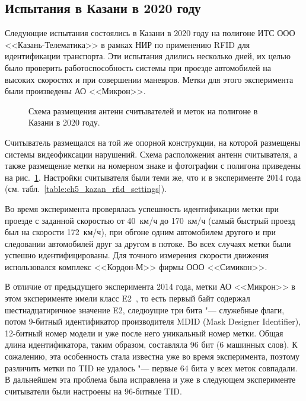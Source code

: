 \subsection{Испытания в Казани в 2020 году}\label{sec:ch5_experiments_kazan2020}

Следующие испытания состоялись в Казани в 2020 году на полигоне ИТС ООО <<Казань-Телематика>> в рамках НИР по применению RFID для идентификации транспорта. Эти испытания длились несколько дней, их целью было проверить работоспособность системы при проезде автомобилей на высоких скоростях и при совершении маневров. Метки для этого эксперимента были произведены АО <<Микрон>>.


\begin{figure}[ht]
  \caption{Схема размещения антенн считывателей и меток на полигоне в Казани в 2020 году.}
  \label{fig:ch5_kazan2020_schema}
\end{figure}

Считыватель размещался на той же опорной конструкции, на которой размещены системы видеофиксации нарушений. Схема расположения антенн считывателя, а также размещение метки на номерном знаке и фотографии с полигона приведены на рис.~\ref{fig:ch5_kazan2020_schema}. Настройки считывателя были теми же, что и в эксперименте 2014 года (см. табл.~\ref{table:ch5_kazan_rfid_settings}).

Во время эксперимента проверялась успешность идентификации метки при проезде с заданной скоростью от 40~км/ч до 170~км/ч (самый быстрый проезд был на скорости 172~км/ч), при обгоне одним автомобилем другого и при следовании автомобилей друг за другом в потоке. Во всех случаях метки были успешно идентифицированы. Для точного измерения скорости движения использовался комплекс <<Кордон-М>> фирмы ООО <<Симикон>>.

В отличие от предыдущего эксперимента 2014 года, метки АО <<Микрон>> в этом эксперименте имели класс E2~\cite{StdGen2}, то есть первый байт содержал шестнадцатиричное значение E2, следюущие три бита "--- служебные флаги, потом 9-битный идентификатор производителя MDID (Mask Designer Identifier), 12-битный номер модели и уже после него уникальный номер метки. Общая длина идентификатора, таким образом, составляла 96 бит (6 машинных слов). К сожалению, эта особенность стала известна уже во время эксперимента, поэтому различить метки по TID не удалось "--- первые 64 бита у всех меток совпадали. В дальнейшем эта проблема была исправлена и уже в следующем эксперименте считыватели были настроены на 96-битные TID.

